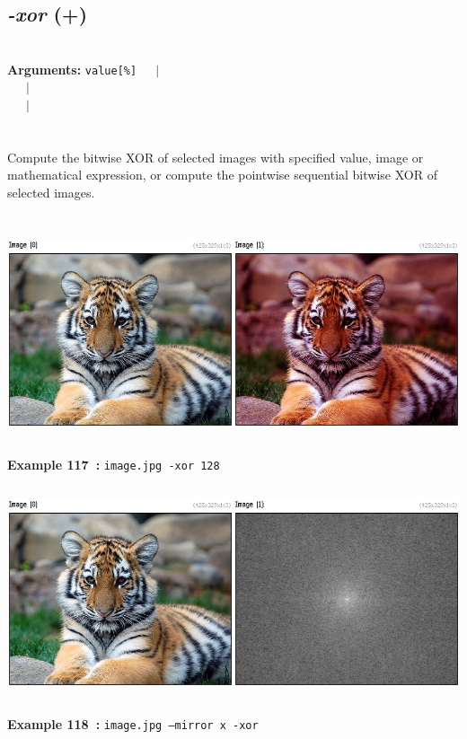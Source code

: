 \documentclass[a4paper,11pt,twoside]{book}
\begin{document}
\subsection{\emph{-xor} (+)}\vspace*{-0.5em}
~\\\textbf{Arguments: } 
{\small \texttt{value[\%]}}~~~$|$\\
\hspace*{2.2cm}{\small \texttt{[image]}}~~~$|$\\
~~~$|$\\
\\~\\
Compute the bitwise XOR of selected images with specified value, image or mathematical
expression, or compute the pointwise sequential bitwise XOR of selected images.
\begin{center}\includegraphics[keepaspectratio=true,height=7cm,width=\textwidth]{img/gmic_def117.jpg}\\
{\footnotesize \textbf{Example 117~:} \texttt{image.jpg -xor 128}}
\\\includegraphics[keepaspectratio=true,height=7cm,width=\textwidth]{img/gmic_def118.jpg}\\
{\footnotesize \textbf{Example 118~:} \texttt{image.jpg --mirror x -xor}}
\end{center}
\end{document}
